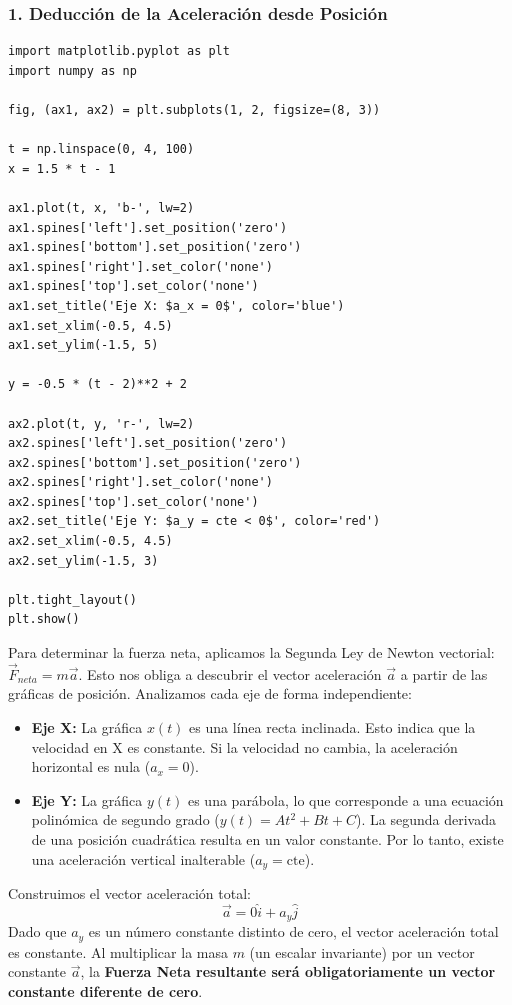 \documentclass[12pt, a4paper]{article}
\begin{document}
\subsubsection*{1. Deducción de la Aceleración desde Posición}

\begin{verbatim}
import matplotlib.pyplot as plt
import numpy as np

fig, (ax1, ax2) = plt.subplots(1, 2, figsize=(8, 3))

t = np.linspace(0, 4, 100)
x = 1.5 * t - 1

ax1.plot(t, x, 'b-', lw=2)
ax1.spines['left'].set_position('zero')
ax1.spines['bottom'].set_position('zero')
ax1.spines['right'].set_color('none')
ax1.spines['top'].set_color('none')
ax1.set_title('Eje X: $a_x = 0$', color='blue')
ax1.set_xlim(-0.5, 4.5)
ax1.set_ylim(-1.5, 5)

y = -0.5 * (t - 2)**2 + 2

ax2.plot(t, y, 'r-', lw=2)
ax2.spines['left'].set_position('zero')
ax2.spines['bottom'].set_position('zero')
ax2.spines['right'].set_color('none')
ax2.spines['top'].set_color('none')
ax2.set_title('Eje Y: $a_y = cte < 0$', color='red')
ax2.set_xlim(-0.5, 4.5)
ax2.set_ylim(-1.5, 3)

plt.tight_layout()
plt.show()
\end{verbatim}

Para determinar la fuerza neta, aplicamos la Segunda Ley de Newton vectorial: $\vec{F}_{neta} = m\vec{a}$. Esto nos obliga a descubrir el vector aceleración $\vec{a}$ a partir de las gráficas de posición.
Analizamos cada eje de forma independiente:
\begin{itemize}
    \item \textbf{Eje X:} La gráfica $x(t)$ es una línea recta inclinada. Esto indica que la velocidad en X es constante. Si la velocidad no cambia, la aceleración horizontal es nula ($a_x = 0$).
    \item \textbf{Eje Y:} La gráfica $y(t)$ es una parábola, lo que corresponde a una ecuación polinómica de segundo grado ($y(t) = At^2 + Bt + C$). La segunda derivada de una posición cuadrática resulta en un valor constante. Por lo tanto, existe una aceleración vertical inalterable ($a_y = \text{cte}$).
\end{itemize}

Construimos el vector aceleración total:
$$ \vec{a} = 0\hat{i} + a_y\hat{j} $$
Dado que $a_y$ es un número constante distinto de cero, el vector aceleración total es constante. 
Al multiplicar la masa $m$ (un escalar invariante) por un vector constante $\vec{a}$, la \textbf{Fuerza Neta resultante será obligatoriamente un vector constante diferente de cero}.
\end{document}
